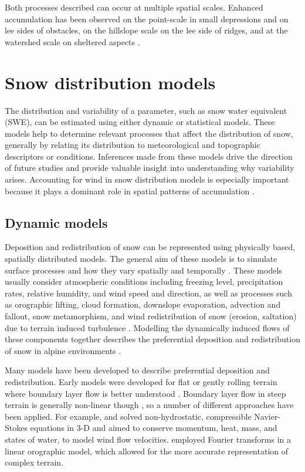 \documentclass[12pt]{article}
\begin{document}
Both processes described can occur at multiple spatial scales. Enhanced accumulation has been observed on the point-scale in small depressions and on lee sides of obstacles, on the hillslope scale on the lee side of ridges, and at the watershed scale on sheltered aspects \citep{Harrison1986, Bloeschl1992, Mott2008, Winstral2002, Clark2011}. 

\section{Snow distribution models}
The distribution and variability of a parameter, such as snow water equivalent (SWE), can be estimated using either dynamic or statistical models. These models help to determine relevant processes that affect the distribution of snow, generally by relating its distribution to meteorological and topographic descriptors or conditions. Inferences made from these models drive the direction of future studies and provide valuable insight into understanding why variability arises. Accounting for wind in snow distribution models is especially important because it plays a dominant role in spatial patterns of accumulation \citep{Winstral2013}.

\subsection{Dynamic models}
Deposition and redistribution of snow can be represented using physically based, spatially distributed models. The general aim of these models is to simulate surface processes and how they vary spatially and temporally \citep{Mott2008}. These models usually consider atmospheric conditions including freezing level, precipitation rates, relative humidity, and wind speed and direction, as well as processes such as orographic lifting, cloud formation, downslope evaporation, advection and fallout, snow metamorphism, and wind redistribution of snow (erosion, saltation) due to terrain induced turbulence \citep{Smith2004, Liston2006, Lehning2008, Mott2008}.  Modelling the dynamically induced flows of these components together describes the preferential deposition and redistribution of snow in alpine environments \citep{Lehning2008,Mott2008,Dadic2010}.

Many models have been developed to describe preferential deposition and redistribution. Early models were developed for flat or gently rolling terrain where boundary layer flow is better understood \citep{Dadic2010}. Boundary layer flow in steep terrain is generally non-linear though \citep{Mott2008, Dadic2010}, so a number of different approaches have been applied.  For example, \cite{Dadic2010} and \citep{Lehning2008} solved non-hydrostatic, compressible Navier-Stokes equations in 3-D and aimed to conserve momentum, heat, mass, and states of water, to model wind flow velocities. \cite{Smith2004} employed Fourier transforms in a linear orographic model, which allowed for the more accurate representation of complex terrain. 
\end{document}
